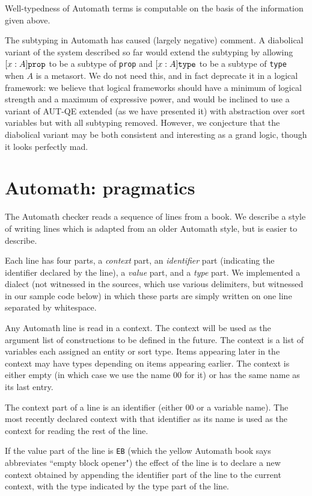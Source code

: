 \documentclass{article}
\begin{document}
Well-typedness of Automath terms is computable on the basis of the information given above.

The subtyping in Automath has caused (largely negative) comment.  A diabolical variant of the system described so far would extend the subtyping by
allowing $[x:A]{\tt prop}$ to be a subtype of {\tt prop} and $[x:A]{\tt type}$ to be a subtype of {\tt type} when $A$ is a metasort.  We do not need this, and in fact deprecate it in a logical framework:  we believe that logical frameworks should have a minimum of logical strength and a maximum of expressive power, and would be inclined to use a variant of AUT-QE extended (as we have presented it) with abstraction over sort variables but with all subtyping removed.  However, we conjecture that the diabolical variant may be both consistent and interesting as a grand logic, though it looks perfectly mad.


\section{Automath:  pragmatics}

The Automath checker reads a sequence of lines from a book.  We describe a style of writing lines which is adapted from an older Automath style, but is easier to describe.

Each line has four parts, a {\em context\/} part, an {\em identifier\/} part (indicating the identifier declared by the line), a {\em value\/} part, and a {\em type\/} part.  We implemented a dialect (not witnessed in the sources, which use various delimiters, but witnessed in our sample code below) in which these parts are simply written on one line separated by whitespace.

Any Automath line is read in a context.  The context will be used as the argument list of constructions to be defined in the future.  The context is a list of variables each assigned an entity or sort type.  Items appearing later in the context may have types depending on items appearing earlier.  The context is either empty (in which case we use the name 00 for it) or has the same name as its last entry.

The context part of a line is an identifier (either 00 or a variable name).  The most recently declared context with that identifier as its name
is used as the context for reading the rest of the line.


If the value part of the line is {\tt EB} (which the yellow Automath book says abbreviates ``empty block opener") the effect of the line is to declare a new context obtained by appending the identifier part of the line to the current context, with the type indicated by the type part of the line.
\end{document}
